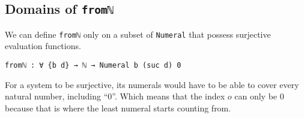 \documentclass[\main/thesis.tex]{subfiles}
\begin{document}
\begin{center}
    \begin{adjustbox}{max width=\textwidth}
    \end{adjustbox}
\end{center}

\subsection{Domains of \lstinline|fromℕ|}

We can define \lstinline|fromℕ| only on a subset of \lstinline|Numeral| that
possess surjective evaluation functions.

\begin{lstlisting}
fromℕ : ∀ {b d} → ℕ → Numeral b (suc d) 0
\end{lstlisting}

For a system to be surjective, its numerals would have to be able to cover every
natural number, including ``0''.
Which means that the index $o$ can only be $0$ because that is where the least
numeral starts counting from.
\end{document}
